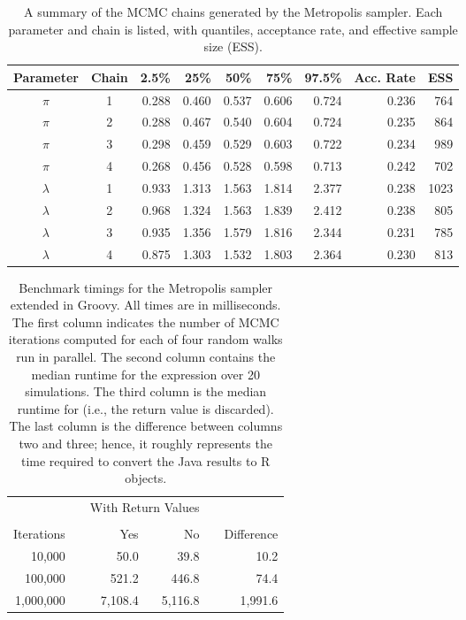 \vspace{0.33cm}

\begin{table}[h!]
\centering
\caption{A summary of the MCMC chains generated by the Metropolis sampler. Each parameter and chain is listed, with quantiles, acceptance rate, and effective sample size (ESS).}
\begin{tabular}{ccrrrrrrr}
\toprule
Parameter & Chain & 2.5\% & 25\% & 50\% & 75\% & 97.5\% & Acc. Rate & ESS \\ \midrule
$\pi$ &    1 & 0.288 & 0.460 & 0.537 & 0.606 & 0.724 & 0.236 &  764 \\ 
$\pi$ &    2 & 0.288 & 0.467 & 0.540 & 0.604 & 0.724 & 0.235 &  864 \\ 
$\pi$ &    3 & 0.298 & 0.459 & 0.529 & 0.603 & 0.722 & 0.234 &  989 \\ 
$\pi$ &    4 & 0.268 & 0.456 & 0.528 & 0.598 & 0.713 & 0.242 &  702 \\ 
$\lambda$ &    1 & 0.933 & 1.313 & 1.563 & 1.814 & 2.377 & 0.238 & 1023 \\ 
$\lambda$ &    2 & 0.968 & 1.324 & 1.563 & 1.839 & 2.412 & 0.238 &  805 \\ 
$\lambda$ &    3 & 0.935 & 1.356 & 1.579 & 1.816 & 2.344 & 0.231 &  785 \\ 
$\lambda$ &    4 & 0.875 & 1.303 & 1.532 & 1.803 & 2.364 & 0.230 &  813 \\ \bottomrule
\end{tabular}
\label{tab:mcmcx}
\end{table}

\vspace{0.33cm}

\begin{table}[h!]
\centering
\caption{Benchmark timings for the Metropolis sampler extended in Groovy. All times are in milliseconds. The first column indicates the number of MCMC iterations computed for each of four random walks run in parallel. The second column contains the median runtime for the expression  over 20 simulations. The third column is the median runtime for  (i.e., the return value is discarded). The last column is the difference between columns two and three; hence, it roughly represents the time required to convert the Java results to R objects.}
\begin{tabular}{rrrrrr}
\toprule
& & \multicolumn{2}{c}{With Return Values} & & \\
\cline{3-4} \\[-8pt]
Iterations & & \multicolumn{1}{r}{Yes} & \multicolumn{1}{r}{No} & & Difference \\ \midrule 
10,000 & & 50.0 & 39.8 & & 10.2 \\
100,000 & & 521.2 & 446.8 & & 74.4 \\
1,000,000 & & 7,108.4 & 5,116.8 & & 1,991.6 \\ \bottomrule
\end{tabular}
\label{tab:mcmcgroovy}
\end{table}


